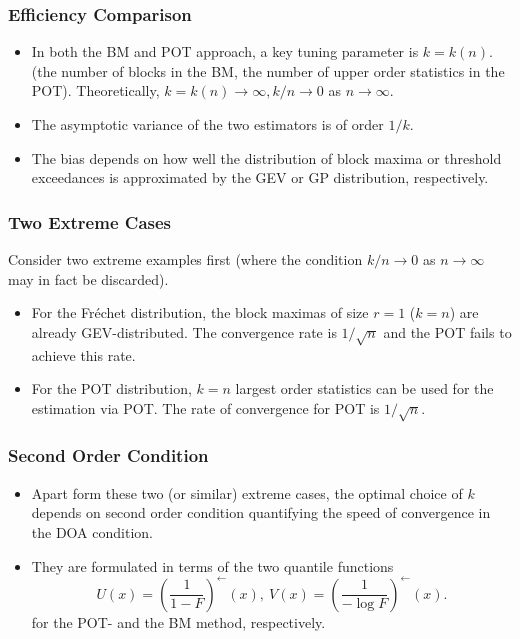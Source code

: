\documentclass{beamer}
\newcommand{\suit}[1]{\left(#1\right)}
\begin{document}
\begin{frame}
    \frametitle{Efficiency Comparison}
    \begin{itemize}
    \item In both the BM and POT approach, a key tuning parameter is $k=k(n)$. (the number of blocks in the BM, the number
    of upper order statistics in the POT). {\color{red} Theoretically, $k=k(n)\to \infty,k/n\to 0$ as $n \to \infty$.}
    \item The asymptotic variance of the two estimators is of order $1/k$.
    \item The bias
    depends on how well the distribution of block maxima or threshold exceedances is approximated
    by the GEV or GP distribution, respectively.
\end{itemize}
    

\end{frame}

\begin{frame}
    \frametitle{Two Extreme Cases}
    Consider two extreme examples first (where the condition $k/n \to 0$ as $n \to \infty$ may in fact be discarded).
    \begin{itemize}
        \item For the Fr\'echet distribution, the block maximas of size $r=1$ ($k=n$) are already GEV-distributed. The convergence rate is $1/\sqrt{n}$ and the POT fails to achieve this rate.
        \item For the POT distribution, $k=n$ largest order
         statistics can be used for the estimation via POT. The rate of convergence for POT is $1/\sqrt{n}$.
    \end{itemize}
    

\end{frame}

\begin{frame}
    \frametitle{Second Order Condition}
    \begin{itemize}
        \item    Apart form these two (or similar) extreme cases, the optimal choice of $k$ depends on second order condition quantifying the speed of convergence in the DOA condition.
        \item They are formulated in terms of the two quantile functions 
        $$
            U(x)=\suit{\frac{1}{1-F}}^{\leftarrow}(x), \ V(x)=\suit{\frac{1}{-\log F}}^{\leftarrow}(x).
        $$
        for the POT- and the BM method, respectively.
    \end{itemize}
 
\end{frame}
\end{document}
